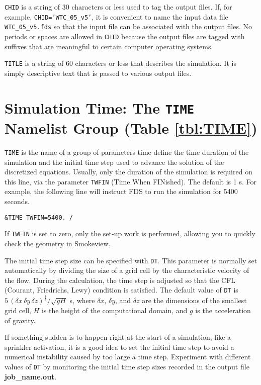 \documentclass[11pt]{book}
\newcommand{\ct}{\tt\small}
\newcommand{\dx}{\delta x}
\newcommand{\dy}{\delta y}
\newcommand{\dz}{\delta z}
\newcommand{\ot}{\frac{1}{3}}
\begin{document}
\begin{description}
\item {\ct CHID} is a string
of 30 characters or less used to tag the output files. If, for example, {\ct CHID='WTC\_05\_v5'}, it is convenient to
name the input data file {\ct WTC\_05\_v5.fds} so that the input file
can be associated with the output files. No periods or spaces are allowed in
{\ct CHID} because the output files are tagged with suffixes that
are meaningful to certain computer operating systems.
\item {\ct TITLE} is a string of 60 characters or less that describes the
simulation. It is simply descriptive text that is passed to various output files.
\end{description}



\section{Simulation Time: The \texorpdfstring{{\tt TIME}}{TIME} Namelist Group (Table \ref{tbl:TIME})}%
\label{info:TIME}

{\ct TIME} is the name of a group of parameters time define the time
duration of the simulation and the initial time step used to advance
the solution of the discretized equations. Usually, only the
duration of the simulation is required on this line, via the
parameter {\ct TWFIN} (Time When FINished). The default is 1 s.
For example, the following line will instruct FDS to run the simulation for 5400 seconds.

\footnotesize
\begin{verbatim}
&TIME TWFIN=5400. /
\end{verbatim}
\normalsize
If {\ct TWFIN} is set to zero, only the set-up work is
performed, allowing you to quickly check the geometry in
Smokeview.

The initial time step size can be specified with
{\ct DT}. This parameter is normally set automatically by dividing the size of a grid cell by the
characteristic velocity of the flow.
During the calculation, the time step is adjusted so that the CFL (Courant, Friedrichs, Lewy) condition is
satisfied. The default value of {\ct DT} is $5 \, (\dx \, \dy \, \dz)^\ot/\sqrt{gH}$ s, where
$\dx$, $\dy$, and $\dz$ are the dimensions of the smallest grid
cell, $H$ is the height of the computational domain, and $g$ is the acceleration of gravity.

\begin{warning}
If something sudden is to
happen right at the start of a simulation, like a sprinkler activation, it is a good idea to set the initial time step
to avoid a numerical instability caused by too large a time step. Experiment with different values of {\ct DT}
by monitoring the initial time step sizes
recorded in the output file {\bf job\_name.out}.
\end{warning}
\end{document}
